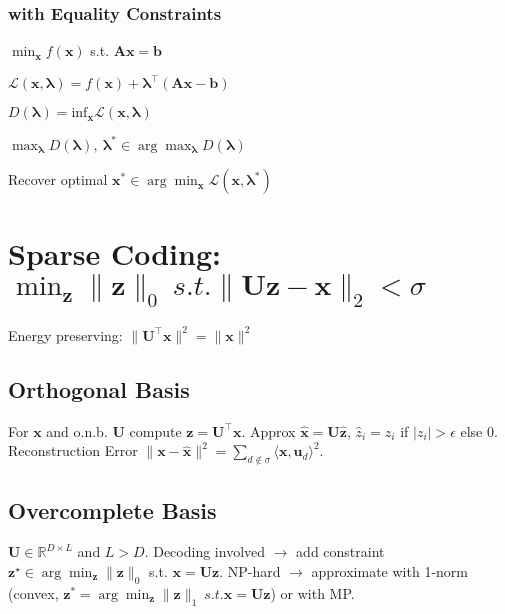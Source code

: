 \documentclass[a4paper, 11pt, landscape]{article}
\begin{document}
\begin{multicols*}{3}
\subsubsection{with Equality Constraints}
\begin{inparaitem}[\color{red}\textbullet]
\item $\min_{\mathbf{x}} f(\mathbf{x})$ s.t. $\mathbf{A}\mathbf{x}= \mathbf{b}$
\item $\mathcal{L}(\mathbf{x},\bm{\lambda}) = f(\mathbf{x}) + \bm{\lambda}^\top (\mathbf{A}\mathbf{x}-\mathbf{b})$
\item $D(\bm{\lambda}) = \mathrm{inf}_{\mathbf{x}} \mathcal{L} (\mathbf{x}, \bm{\lambda})$
\item $\max_{\bm{\lambda}} D(\bm{\lambda}),\ \bm{\lambda}^* \in \arg\max_{\bm{\lambda}} D(\bm{\lambda})$
\item Recover optimal $\mathbf{x}^* \in \arg\min_{\mathbf{x}} \mathcal{L}(\mathbf{x}, \bm{\lambda}^*)$
\end{inparaitem}


\section{Sparse Coding: $\min_{\mathbf{z}} \|\mathbf{z}\|_0\ s.t. \|\mathbf{U}\mathbf{z}-\mathbf{x}\|_2 < \sigma $}


Energy preserving: $\|\mathbf{U}^\top\mathbf{x}\|^2 = \|\mathbf{x}\|^2$

\subsection{Orthogonal Basis}
For $\mathbf{x}$ and o.n.b. $\mathbf{U}$ compute $\mathbf{z} = \mathbf{U}^\top \mathbf{x} $. Approx $ \mathbf{\hat{x}} = \mathbf{U\hat{z}}$, $\hat{z}_i = z_i$ if $ \lvert z_i \rvert > \epsilon$ else 0.
Reconstruction Error $\|\mathbf{x}-\mathbf{\hat{x}}\|^2 = \sum_{d\notin\sigma}\langle\mathbf{x},\mathbf{u}_d\rangle ^2$.


\subsection{Overcomplete Basis}
$\mathbf{U} \in \mathbb{R}^{D \times  L}$ and $L > D$. Decoding involved $\rightarrow$ add constraint $\mathbf{z}^\star \in \arg\min_\mathbf{z} \lVert \mathbf{z} \rVert_0$ s.t. $\mathbf{x} = \mathbf{Uz}$. NP-hard $\rightarrow$ approximate with 1-norm (convex, $\mathbf{z}^* = \arg\min_{\mathbf{z}} \|\mathbf{z}\|_1\ s.t. \mathbf{x} = \mathbf{U}\mathbf{z} $) or with MP.


\end{multicols*}
\end{document}
